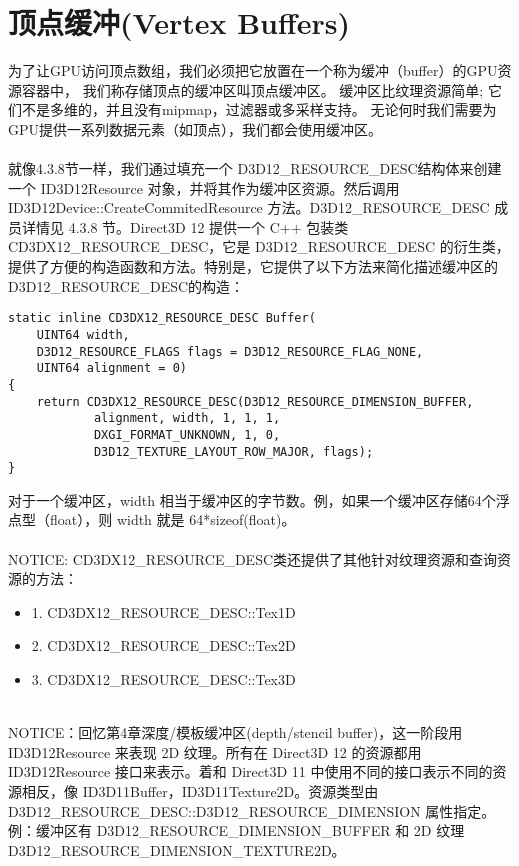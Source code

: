 \section{顶点缓冲(Vertex Buffers)}
\begin{flushleft}
为了让GPU访问顶点数组，我们必须把它放置在一个称为缓冲（buffer）的GPU资源容器中， 我们称存储顶点的缓冲区叫顶点缓冲区。 缓冲区比纹理资源简单; 它们不是多维的，并且没有mipmap，过滤器或多采样支持。 无论何时我们需要为GPU提供一系列数据元素（如顶点），我们都会使用缓冲区。\\
~\\
就像4.3.8节一样，我们通过填充一个 D3D12\_RESOURCE\_DESC结构体来创建一个 ID3D12Resource 对象，并将其作为缓冲区资源。然后调用 ID3D12Device::CreateCommitedResource 方法。D3D12\_RESOURCE\_DESC 成员详情见 4.3.8 节。Direct3D 12 提供一个 C++ 包装类 CD3DX12\_RESOURCE\_DESC，它是 D3D12\_RESOURCE\_DESC 的衍生类，提供了方便的构造函数和方法。特别是，它提供了以下方法来简化描述缓冲区的D3D12\_RESOURCE\_DESC的构造：
\begin{lstlisting}
static inline CD3DX12_RESOURCE_DESC Buffer(
    UINT64 width, 
    D3D12_RESOURCE_FLAGS flags = D3D12_RESOURCE_FLAG_NONE,
    UINT64 alignment = 0)
{
    return CD3DX12_RESOURCE_DESC(D3D12_RESOURCE_DIMENSION_BUFFER, 
            alignment, width, 1, 1, 1, 
            DXGI_FORMAT_UNKNOWN, 1, 0,
            D3D12_TEXTURE_LAYOUT_ROW_MAJOR, flags);
}
\end{lstlisting}
对于一个缓冲区，width 相当于缓冲区的字节数。例，如果一个缓冲区存储64个浮点型（float），则 width 就是 64*sizeof(float)。\\
~\\
NOTICE: CD3DX12\_RESOURCE\_DESC类还提供了其他针对纹理资源和查询资源的方法：\\
\begin{itemize}
    \item 1. CD3DX12\_RESOURCE\_DESC::Tex1D
    \item 2. CD3DX12\_RESOURCE\_DESC::Tex2D
    \item 3. CD3DX12\_RESOURCE\_DESC::Tex3D
\end{itemize}
~\\
NOTICE：回忆第4章深度/模板缓冲区(depth/stencil buffer)，这一阶段用ID3D12Resource 来表现 2D 纹理。所有在 Direct3D 12 的资源都用 ID3D12Resource 接口来表示。着和 Direct3D 11 中使用不同的接口表示不同的资源相反，像 ID3D11Buffer，ID3D11Texture2D。资源类型由 D3D12\_RESOURCE\_DESC::D3D12\_RESOURCE\_DIMENSION 属性指定。例：缓冲区有 D3D12\_RESOURCE\_DIMENSION\_BUFFER 和 2D 纹理 D3D12\_RESOURCE\_DIMENSION\_TEXTURE2D。\\

\end{flushleft}
